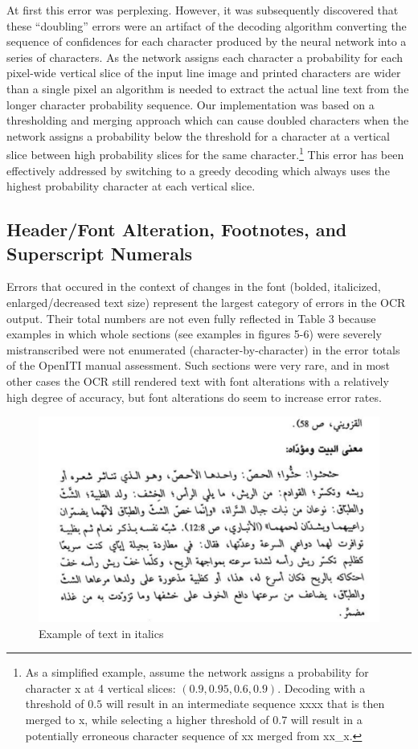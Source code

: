 At first this error was perplexing. However, it was subsequently discovered
that these “doubling” errors were an artifact of the decoding algorithm
converting the sequence of confidences for each character produced by the
neural network into a series of characters. As the network assigns each
character a probability for each pixel-wide vertical slice of the input line
image and printed characters are wider than a single pixel an algorithm is
needed to extract the actual line text from the longer character probability
sequence. Our implementation was based on a thresholding and merging approach
which can cause doubled characters when the network assigns a probability below
the threshold for a character at a vertical slice between high probability
slices for the same character.\footnote{As a simplified example, assume the
network assigns a probability for character x at 4 vertical slices: $(0.9, 0.95,
0.6, 0.9)$. Decoding with a threshold of $0.5$ will result in an intermediate
sequence xxxx that is then merged to x, while selecting a higher threshold of
$0.7$ will result in a potentially erroneous character sequence of xx merged from
xx\_x.} This error has been effectively addressed by switching to a greedy
decoding which always uses the highest probability character at each vertical
slice.

\subsection{Header/Font Alteration, Footnotes, and Superscript Numerals}

Errors that occured in the context of changes in the font (bolded, italicized,
enlarged/decreased text size) represent the largest category of errors in the
OCR output. Their total numbers are not even fully reflected in Table 3 because
examples in which whole sections (see examples in figures 5-6) were severely
mistranscribed were not enumerated (character-by-character) in the error totals
of the OpenITI manual assessment. Such sections were very rare, and in most
other cases the OCR still rendered text with font alterations with a relatively
high degree of accuracy, but font alterations do seem to increase error rates.

\begin{figure}[h]
	\includegraphics[width=\linewidth]{images/image19.png}
	\caption{Example of text in italics}
	\label{fig:fig5}
\end{figure}

